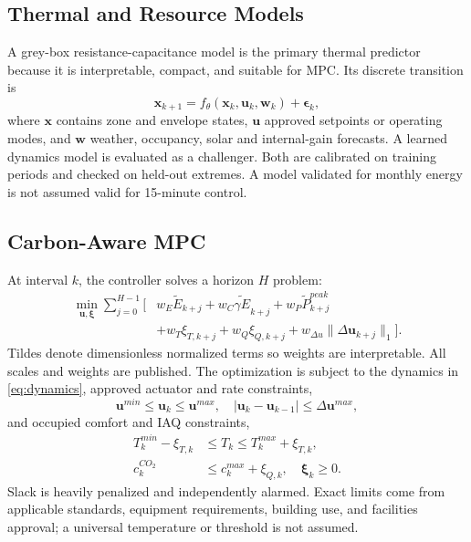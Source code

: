 \subsection{Thermal and Resource Models}

A grey-box resistance-capacitance model is the primary thermal predictor because it is interpretable, compact, and suitable for MPC. Its discrete transition is
\begin{equation}
	\bm{x}_{k+1}=f_\theta(\bm{x}_k,\bm{u}_k,\bm{w}_k)+\bm{\epsilon}_k,
	\label{eq:dynamics}
\end{equation}
where $\bm{x}$ contains zone and envelope states, $\bm{u}$ approved setpoints or operating modes, and $\bm{w}$ weather, occupancy, solar and internal-gain forecasts. A learned dynamics model is evaluated as a challenger. Both are calibrated on training periods and checked on held-out extremes. A model validated for monthly energy is not assumed valid for 15-minute control.

\subsection{Carbon-Aware MPC}

At interval $k$, the controller solves a horizon $H$ problem:
\begin{align}
	\min_{\bm{u},\bm{\xi}} \sum_{j=0}^{H-1} [ & w_E\tilde E_{k+j}+w_C\widetilde{\gamma E}_{k+j}
	+w_P\tilde P_{k+j}^{peak}\nonumber                                                          \\
	                                          & +w_T\xi_{T,k+j}+w_Q\xi_{Q,k+j}
			+w_{\Delta u}\|\Delta\bm{u}_{k+j}\|_1].
	\label{eq:mpc-objective}
\end{align}
Tildes denote dimensionless normalized terms so weights are interpretable. All scales and weights are published. The optimization is subject to the dynamics in \cref{eq:dynamics}, approved actuator and rate constraints,
\begin{equation}
	\bm{u}^{min}\le\bm{u}_k\le\bm{u}^{max},\quad
	|\bm{u}_k-\bm{u}_{k-1}|\le\Delta\bm{u}^{max},
	\label{eq:actuator}
\end{equation}
and occupied comfort and IAQ constraints,
\begin{align}
	T_k^{min}-\xi_{T,k} & \le T_k\le T_k^{max}+\xi_{T,k},               \\
	c_k^{CO_2}          & \le c_k^{max}+\xi_{Q,k},\quad \bm{\xi}_k\ge0.
	\label{eq:service-constraints}
\end{align}
Slack is heavily penalized and independently alarmed. Exact limits come from applicable standards, equipment requirements, building use, and facilities approval; a universal temperature or \COtwo{} threshold is not assumed.

